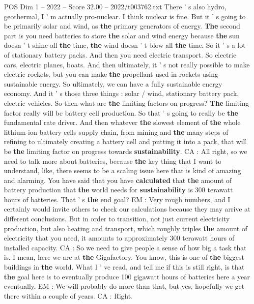 \begin{textsample}{POS Dim 1 – 2022 – Score 32.00 – 2022/t003762.txt}
There ' s also hydro, geothermal, I ' m actually pro-nuclear.
I think nuclear is fine.
But it ' s going to be primarily solar and wind, as \textbf{the} primary generators of energy. \textbf{The} second part is you need batteries to store \textbf{the} solar and wind energy because \textbf{the} sun doesn ' t shine all \textbf{the} time, \textbf{the} wind doesn ' t blow all \textbf{the} time.
So it ' s a lot of stationary battery packs.
And then you need electric transport.
So electric cars, electric planes, boats.
And then ultimately, it ' s not really possible to make electric rockets, but you can make \textbf{the} propellant used in rockets using sustainable energy.
So ultimately, we can have a fully sustainable energy economy.
And it ' s those three things : solar / wind, stationary battery pack, electric vehicles.
So then what are \textbf{the} limiting factors on progress? \textbf{The} limiting factor really will be battery cell production.
So that ' s going to really be \textbf{the} fundamental rate driver.
And then whatever \textbf{the} slowest element of \textbf{the} whole lithium-ion battery cells supply chain, from mining and \textbf{the} many steps of refining to ultimately creating a battery cell and putting it into a pack, that will be \textbf{the} limiting factor on progress towards \textbf{sustainability}.
CA : All right, so we need to talk more about batteries, because \textbf{the} key thing that I want to understand, like, there seems to be a scaling issue here that is kind of amazing and alarming.
You have said that you have \textbf{calculated} that \textbf{the} amount of battery production that \textbf{the} world needs for \textbf{sustainability} is 300 terawatt hours of batteries.
That ' s \textbf{the} end goal?
EM : Very rough numbers, and I certainly would invite others to check our calculations because they may arrive at different conclusions.
But in order to transition, not just current electricity production, but also heating and transport, which roughly triples \textbf{the} amount of electricity that you need, it amounts to approximately 300 terawatt hours of installed capacity.
CA : So we need to give people a sense of how big a task that is.
I mean, here we are at \textbf{the} Gigafactory.
You know, this is one of \textbf{the} biggest buildings in \textbf{the} world.
What I ' ve read, and tell me if this is still right, is that \textbf{the} goal here is to eventually produce 100 gigawatt hours of batteries here a year eventually.
EM : We will probably do more than that, but yes, hopefully we get there within a couple of years.
CA : Right.

\end{textsample}
